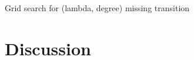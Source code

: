 \documentclass[10pt,conference,compsocconf]{IEEEtran}
\begin{document}
\begin{comment}
  \multicolumn{1}{l|}{Accuracy} &
  \multicolumn{1}{l|}{F1-score} &
  \multicolumn{1}{l|}{Accuracy} \\ \hline
\multicolumn{1}{|l|}{PRI\_jet\_0\_0} &
  1e-8 &
  10 &
  median &
  \multirow{6}{*}{61.66\%} &
  \multirow{6}{*}{87.76\%} &
  \multirow{6}{*}{59.05\%} &
  \multirow{6}{*}{87.20\%} &
  \multirow{6}{*}{75.30\%} &
  \multirow{6}{*}{83.50\%} \\ \cline{1-4}
\multicolumn{1}{|l|}{PRI\_jet\_0\_1}    & 1e-14     & 10     & median     &               &               &                &                &               &              \\ \cline{1-4}
\multicolumn{1}{|l|}{PRI\_jet\_1\_0}    & 1e-8      & 6      & mode       &               &               &                &                &               &              \\ \cline{1-4}
\multicolumn{1}{|l|}{PRI\_jet\_1\_1}    & 1e-16     & 10     & mode       &               &               &                &                &               &              \\ \cline{1-4}
\multicolumn{1}{|l|}{PRI\_jet\_2\_3\_0} & 1e-3      & 3      & mode       &               &               &                &                &               &              \\ \cline{1-4}
\multicolumn{1}{|l|}{PRI\_jet\_2\_3\_1} & 1e-15     & 11     & mode       &               &               &                &                &               &              \\ \hline
\end{tabular}%
}
\caption{Parameters, F1-score and accuracy results.}
\label{tab:6_models}
\end{table}
\end{comment}

\FloatBarrier
Grid search for (lambda, degree)
missing transition
\section{Discussion}
\end{document}
